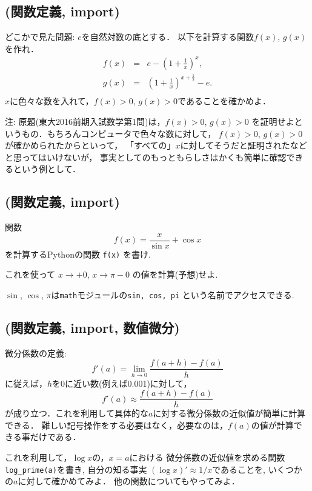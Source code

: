 \documentclass[10pt,dvipdfmx]{article}
\begin{document}
\subsection{{\scriptsize (関数定義, import)}}
どこかで見た問題: $e$を自然対数の底とする．
以下を計算する関数$f(x)$, $g(x)$を作れ．
\begin{eqnarray*}
f(x) & = & e - \left(1 + \frac{1}{x}\right)^x, \\
g(x) & = & \left(1 + \frac{1}{x}\right)^{x+\frac{1}{2}} - e. \\
\end{eqnarray*}
$x$に色々な数を入れて，$f(x) > 0$, $g(x) > 0$であることを確かめよ．

{\footnotesize 注: 原題(東大2016前期入試数学第1問)は，$f(x) > 0$, $g(x) > 0$
を証明せよというもの．もちろんコンピュータで色々な数に対して，
$f(x) > 0$, $g(x) > 0$が確かめられたからといって，
「すべての」$x$に対してそうだと証明されたなどと思ってはいけないが，
事実としてのもっともらしさはかくも簡単に確認できるという例として．}
\fi

\subsection{{\scriptsize (関数定義, import)}}
\label{subsec:sincos}
関数
\[ f(x) = \frac{x}{\sin x} + \cos x \]
を計算するPythonの関数 {\tt f(x)} を書け.

これを使って $x \rightarrow +0$, $x \rightarrow \pi - 0$
の値を計算(予想)せよ.

$\sin$, $\cos$, $\pi$は{\tt math}モジュールの{\tt sin, cos, pi}
という名前でアクセスできる.

\subsection{{\scriptsize (関数定義, import, 数値微分)}}
微分係数の定義:
\[ f'(a) = \lim_{h\rightarrow 0} \frac{f(a + h) - f(a)}{h} \]
に従えば，$h$を0に近い数(例えば0.001)に対して，
\[ f'(a) \approx \frac{f(a + h) - f(a)}{h} \]
が成り立つ．これを利用して具体的な$a$に対する微分係数の近似値が簡単に計算できる．
難しい記号操作をする必要はなく，必要なのは，$f(a)$の値が計算できる事だけである．

これを利用して，$\log x$の，$x = a$における
微分係数の近似値を求める関数{\tt log\_prime(a)}を書き,
自分の知る事実
$(\log x)' \approx 1/x$であることを, いくつかの$a$に対して確かめてみよ．
他の関数についてもやってみよ．
\end{document}
